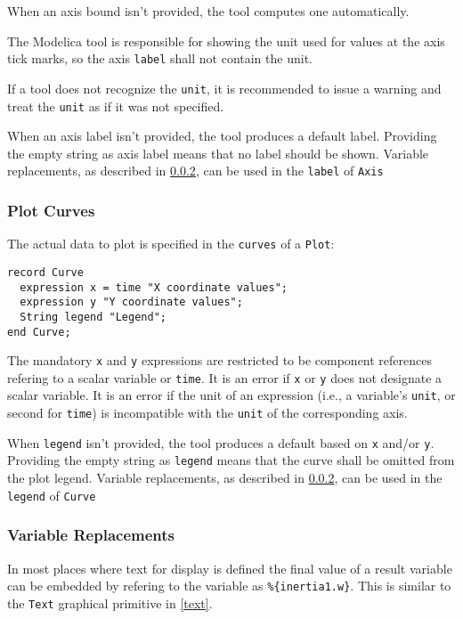 When an axis bound isn't provided, the tool computes one automatically.

The Modelica tool is responsible for showing the unit used for values at the
axis tick marks, so the axis \lstinline!label! shall not contain the unit.

If a tool does not recognize the \lstinline!unit!, it is recommended to issue a
warning and treat the \lstinline!unit! as if it was not specified.

When an axis label isn't provided, the tool produces a default label. Providing
the empty string as axis label means that no label should be shown. Variable
replacements, as described in \cref{variable-replacements}, can be used in
the \lstinline!label! of \lstinline!Axis!

\subsubsection{Plot Curves}\label{plot-curves}
The actual data to plot is specified in the \lstinline!curves! of a \lstinline!Plot!:
\begin{lstlisting}[language=modelica]
record Curve
  expression x = time "X coordinate values";
  expression y "Y coordinate values";
  String legend "Legend";
end Curve;
\end{lstlisting}

The mandatory \lstinline!x! and \lstinline!y! expressions are restricted to be
component references refering to a scalar variable or \lstinline!time!. It
is an error if \lstinline!x! or \lstinline!y! does not designate a scalar variable.
It is an error if the unit of an expression (i.e., a variable's \lstinline!unit!,
or second for \lstinline!time!) is incompatible with the \lstinline!unit! of the
corresponding axis.

When \lstinline!legend! isn't provided, the tool produces a default based on
\lstinline!x! and/or \lstinline!y!.  Providing the empty string as
\lstinline!legend! means that the curve shall be omitted from the plot legend.
Variable replacements, as described in \cref{variable-replacements}, can be
used in the \lstinline!legend! of \lstinline!Curve!

\subsubsection{Variable Replacements}\label{variable-replacements}
In most places where text for display is defined the final value of a result
variable can be embedded by refering to the variable as
\lstinline!%{inertia1.w}!.  This is similar to the \lstinline!Text! graphical primitive
in \cref{text}.

